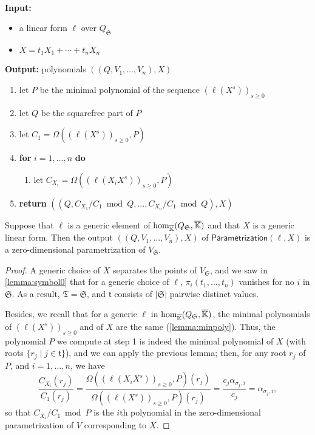 \documentclass[12pt]{article}
\newcommand{\minpoly}{P}
\newcommand{\lf}{X}
\def\Kbar {{\ensuremath{\overline{\mathbb{K}}}}}
\begin{document}
\begin{algorithm}[H]
  \caption{$\mathsf{Parametrization}(\ell,\lf)$}  ~\\
	  {\bf Input:} \vspace{-0.5em}
	  \begin{itemize}\setlength\itemsep{0em}
	  \item  a linear form $\ell$ over $Q_\mathfrak{S}$
	  \item $\lf=t_1 X_1 + \cdots + t_n X_n$
	  \end{itemize}
	      {\bf Output:} polynomials $((Q,V_1,\dots,V_n),\lf)$
	      \begin{enumerate}\setlength\itemsep{0em}
	      \item let $\minpoly$ be the minimal polynomial of the sequence $(\ell(\lf^s))_{s \ge 0}$
	      \item let $Q$ be the squarefree part of $\minpoly$
	      \item let $C_1 = \Omega((\ell(\lf^s))_{s\ge0} ,\minpoly)$
	      \item \textbf{for} $i=1,\dots,n$ \textbf{do}
		\begin{enumerate}
		\item let $C_{X_i} = \Omega((\ell(X_i \lf^s))_{s\ge0}, \minpoly)$ 
		\end{enumerate}
	      \item \textbf{return} $((Q, C_{X_1}/ C_1 \bmod Q, \dots, C_{X_n}/ C_{1} \bmod Q),\lf)$
	      \end{enumerate}
	      \label{algo:para2}
\end{algorithm}

\begin{lemma}
  Suppose that $\ell$ is a generic element of ${\rm
    hom}_{\Kbar}(Q_\mathfrak{S},\Kbar)$ and that $\lf$ is a generic
  linear form. Then the output $((Q,V_1,\dots,V_n),\lf)$ of
  $\mathsf{Parametrization}(\ell,\lf)$ is a zero-dimensional
  parametrization of $V_{\mathfrak{S}}$.
\end{lemma}
\begin{proof}
  A generic choice of $\lf$ separates the points of
  $V_{\mathfrak{S}}$, and we saw in \cref{lemma:symbol0} that for a
  generic choice of $\ell$, $\pi_i(t_1,\dots,t_n)$ vanishes for no $i$
  in $\mathfrak{S}$.  As a result, $\mathfrak{T}=\mathfrak{S}$,
  and $\mathfrak{t}$ consists of $|\mathfrak{S}|$ pairwise distinct 
  values.

  Besides, we recall that for a generic $\ell$ in ${\rm
    hom}_{\Kbar}(Q_\mathfrak{S},\Kbar)$, the minimal polynomials of
  $(\ell(\lf^s))_{s \ge 0}$ and of $\lf$ are the same
  (\cref{lemma:minpoly}).  Thus, the polynomial $\minpoly$ we compute
  at step 1 is indeed the minimal polynomial of $\lf$ (with roots
  $\{r_j \mid j \in \mathfrak{t}\}$), and we can apply the previous
  lemma; then, for any root $r_j$ of $\minpoly$, and $i=1,\dots,n$, we
  have
  $$\frac{ C_{X_i}(r_j)}{ C_1(r_j)} = \frac{\Omega((\ell(X_i
    \lf^s))_{s\ge0}, \minpoly)(r_j)}{\Omega((\ell(\lf^s))_{s\ge0} ,\minpoly)(r_j)}=
  \frac{c_j \alpha_{\sigma_j,i}}{c_j} = \alpha_{\sigma_j,i},$$ so that
  $ C_{X_i}/ C_1 \bmod P$ is the $i$th polynomial in the
  zero-dimensional parametrization of $V$ corresponding to $\lf$.
\end{proof}
\end{document}
